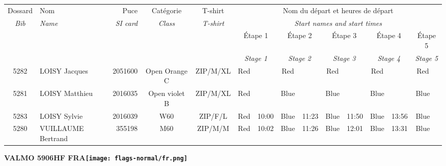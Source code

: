 \documentclass{report}
\begin{document}
  \begin{longtable}{|c|l|r|c|c|*{5}{cc|}}
    Dossard & Nom  & Puce    & Catégorie & T-shirt & \multicolumn{10}{c|}{Nom du départ et heures de départ} \\
    \itshape Bib     & \itshape Name & \itshape SI card & \itshape Class  & \itshape  T-shirt  & \multicolumn{10}{c|}{\itshape Start names and start times} \\
    \hline
    & & & & & \multicolumn{2}{c|}{Étape 1} & \multicolumn{2}{c|}{Étape 2} & \multicolumn{2}{c|}{Étape 3} & \multicolumn{2}{c|}{Étape 4} & \multicolumn{2}{c|}{Étape 5} \\
    & & & & & \multicolumn{2}{c|}{\itshape Stage 1} & \multicolumn{2}{c|}{\itshape Stage 2} & \multicolumn{2}{c|}{\itshape Stage 3} & \multicolumn{2}{c|}{\itshape Stage 4} & \multicolumn{2}{c|}{\itshape Stage 5} \\
    \hline
    5282 & LOISY Jacques & 2051600 & Open Orange C & ZIP/M/XL & Red &   & Red &   & Red &   & Red &   & Red &  \\
    5281 & LOISY Matthieu & 2016035 & Open violet B & ZIP/M/XL & Red &   & Blue &   & Blue &   & Blue &   & Blue &  \\
    5283 & LOISY Sylvie & 2016039 & W60 & ZIP/F/L & Red & 10:00 & Blue & 11:23 & Blue & 11:50 & Blue & 13:56 & Blue &  \\
    5280 & VUILLAUME Bertrand & 355198 & M60 & ZIP/M/M & Red & 10:02 & Blue & 11:26 & Blue & 12:01 & Blue & 13:31 & Blue &  \\
  \end{longtable}
\newpage
  \Huge \centering \bfseries VALMO 5906HF FRA\normalfont \footnotesize \sffamily \hfill \texttt{[image: flags-normal/fr.png]} \newline 
\end{document}
